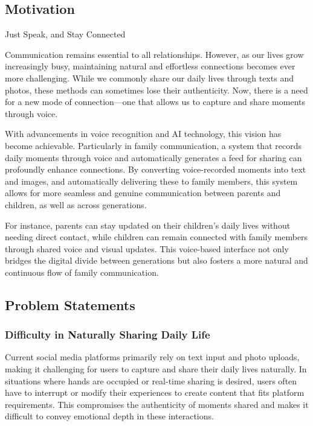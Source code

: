     \subsection{Motivation}
    Just Speak, and Stay Connected

    Communication remains essential to all relationships. However, as our lives grow increasingly busy, maintaining natural and effortless connections becomes ever more challenging. While we commonly share our daily lives through texts and photos, these methods can sometimes lose their authenticity. Now, there is a need for a new mode of connection—one that allows us to capture and share moments through voice.

    With advancements in voice recognition and AI technology, this vision has become achievable. Particularly in family communication, a system that records daily moments through voice and automatically generates a feed for sharing can profoundly enhance connections. By converting voice-recorded moments into text and images, and automatically delivering these to family members, this system allows for more seamless and genuine communication between parents and children, as well as across generations.

    For instance, parents can stay updated on their children's daily lives without needing direct contact, while children can remain connected with family members through shared voice and visual updates. This voice-based interface not only bridges the digital divide between generations but also fosters a more natural and continuous flow of family communication.

    \subsection{Problem Statements}
        \subsubsection{Difficulty in Naturally Sharing Daily Life}
        Current social media platforms primarily rely on text input and photo uploads, making it challenging for users to capture and share their daily lives naturally. In situations where hands are occupied or real-time sharing is desired, users often have to interrupt or modify their experiences to create content that fits platform requirements. This compromises the authenticity of moments shared and makes it difficult to convey emotional depth in these interactions.
        

